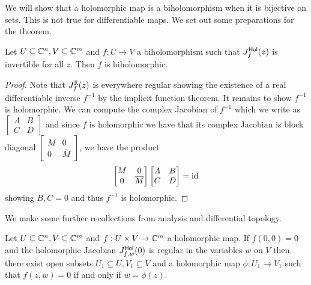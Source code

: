 We will show that a holomorphic map is a biholomorphism when it is bijective on sets. This is not true for differentiable maps. We set out some preparations for the theorem. 
\begin{proposition}\label{prop: invertible holomorphic Jacobian implies biholomorphic}
    Let $U\subseteq\mathbb{C}^{n},V\subseteq\mathbb{C}^{m}$ and $f:U\to V$ a biholomorphism such that $J_{f}^{\mathsf{Hol}}(z)$ is invertible for all $z$. Then $f$ is biholomorphic. 
\end{proposition}
\begin{proof}
    Note that $J_{f}^{\mathbb{R}}(z)$ is everywhere regular showing the existence of a real differentiable inverse $f^{-1}$ by the implicit function theorem. It remains to show $f^{-1}$ is holomorphic. We can compute the complex Jacobian of $f^{-1}$ which we write as $\begin{bmatrix}
        A & B \\ C & D
    \end{bmatrix}$ and since $f$ is holomorphic we have that its complex Jacobian is block diagonal $\begin{bmatrix}
        M & 0 \\ 0 & \overline{M}
    \end{bmatrix}$, we have the product 
    $$\begin{bmatrix}
        M & 0 \\ 0 & \overline{M}
    \end{bmatrix}\begin{bmatrix}
        A & B \\ C & D
    \end{bmatrix}=\mathrm{id}$$
    showing $B,C=0$ and thus $f^{-1}$ is holomorphic. 
\end{proof}
We make some further recollections from analysis and differential topology. 
\begin{theorem}\label{thm: implicit function}
    Let $U\subseteq\mathbb{C}^{n},V\subseteq\mathbb{C}^{m}$ and $f:U\times V\to\mathbb{C}^{m}$ a holomorphic map. If $f(0,0)=0$ and the holomorphic Jacobian $J^{\mathsf{Hol}}_{f,w}(0)$ is regular in the variables $w$ on $V$ then there exist open subsets $U_{1}\subseteq U,V_{1}\subseteq V$ and a holomorphic map $\phi:U_{1}\to V_{1}$ such that $f(z,w)=0$ if and only if $w=\phi(z)$. 
\end{theorem}
